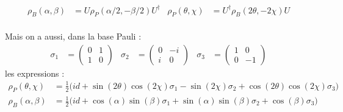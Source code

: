 \begin{align}
	\rho_B(\alpha, \beta) &= U \rho_P(\alpha/2, -\beta/2)U^\dagger  & 
	\rho_P(\theta, \chi) &= U^\dagger \rho_B(2\theta, -2\chi) U
\end{align}
\\
Mais on a aussi, dans la base Pauli :
\begin{align*}
	\sigma_1 &= \begin{pmatrix} 0 & 1 \\ 1 &  0 \end{pmatrix}  &
	\sigma_2 &= \begin{pmatrix} 0 & -i \\  i &  0 \end{pmatrix}  &
	\sigma_3 &= \begin{pmatrix} 1 & 0 \\ 0 & -1 \end{pmatrix}
\end{align*}
les expressions :
\begin{align*}
	\rho_{P}(\theta, \chi) &= \frac{1}{2} \Big( id + \sin(2\theta) \cos(2\chi) \sigma_1 - \sin (2\chi) \sigma_2 + \cos(2\theta) \cos(2\chi) \sigma_3 \Big) \\ 
	\rho_{B}(\alpha, \beta) &= \frac{1}{2} \Big( id + \cos(\alpha) \sin(\beta) \sigma_1 + \sin(\alpha) \sin(\beta) \sigma_2 + \cos (\beta) \sigma_3 \Big)
\end{align*}
\skipl

